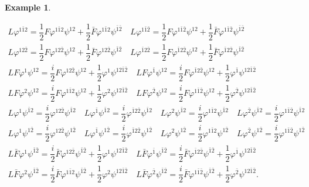 \documentclass[a4paper, 11pt]{amsart}
\theoremstyle{plain}
\theoremstyle{definition}
\newtheorem{esempio}{Example}[section]
\numberwithin{equation}{section}
\begin{document}
\begin{esempio}
\begin{itemize}
\begin{gather*}
            L\varphi^{1\bar1 2} =\dfrac{1}{2}F\varphi^{1\bar1 2}\psi^{12} + \dfrac{1}{2}\bar F\varphi^{1\bar1 2}\psi^{\bar1\bar2} \quad 
            L\varphi^{1\bar1\bar2} = \dfrac{1}{2}F\varphi^{1\bar1 \bar2}\psi^{12} + \dfrac{1}{2}\bar F\varphi^{1\bar1 \bar2}\psi^{\bar1\bar2} \\
            L\varphi^{12\bar2} = \dfrac{1}{2}F\varphi^{12\bar2}\psi^{12} + \dfrac{1}{2}\bar F\varphi^{12\bar2}\psi^{\bar1\bar2} \quad
            L\varphi^{\bar1 2\bar2}  = \dfrac{1}{2}F\varphi^{\bar1 2\bar2}\psi^{12} + \dfrac{1}{2}\bar F\varphi^{\bar1 2\bar2}\psi^{\bar1\bar2}\\ 
            LF\varphi^{1}\psi^{12} = \dfrac{i}{2}F\varphi^{12\bar2}\psi^{12} + \dfrac{1}{2}\varphi^{1}\psi^{12\bar1\bar2} \quad LF\varphi^{\bar1}\psi^{12} = \dfrac{i}{2}F\varphi^{\bar1 2\bar2}\psi^{12} + \dfrac{1}{2}\varphi^{\bar1}\psi^{12\bar1\bar2}\\
            LF\varphi^{2}\psi^{12} = \dfrac{i}{2}F\varphi^{1\bar1 2}\psi^{12} + \dfrac{1}{2}\varphi^{2}\psi^{12\bar1\bar2} \quad LF\varphi^{\bar2}\psi^{12} = \dfrac{i}{2}F\varphi^{1\bar1 \bar2}\psi^{12} + \dfrac{1}{2}\varphi^{\bar2}\psi^{12\bar1\bar2} \\
            L\varphi^{1}\psi^{\bar1 2} = \dfrac{i}{2}\varphi^{12\bar2}\psi^{\bar1 2} \quad
            L\varphi^{\bar1}\psi^{\bar1 2} = \dfrac{i}{2}\varphi^{\bar1 2\bar2}\psi^{\bar1 2} \quad
            L\varphi^{2}\psi^{\bar1 2} = \dfrac{i}{2}\varphi^{1\bar1 2}\psi^{\bar1 2} \quad 
            L\varphi^{\bar2}\psi^{\bar1 2} = \dfrac{i}{2}\varphi^{1\bar1\bar2}\psi^{\bar1 2}\\
            L\varphi^{1}\psi^{1 \bar2} = \dfrac{i}{2}\varphi^{12\bar2}\psi^{1 \bar2} \quad L\varphi^{\bar1}\psi^{1 \bar2} = \dfrac{i}{2}\varphi^{\bar1 2\bar2}\psi^{1 \bar2} \quad
            L\varphi^{2}\psi^{1 \bar2} = \dfrac{i}{2}\varphi^{1\bar1 2}\psi^{1 \bar2} \quad
            L\varphi^{\bar2}\psi^{1 \bar2} = \dfrac{i}{2}\varphi^{1\bar1 \bar2}\psi^{1 \bar2} \\
            L\bar F\varphi^{1}\psi^{\bar1\bar2} = \dfrac{i}{2}\bar F\varphi^{12\bar2}\psi^{\bar1\bar2} + \dfrac{1}{2} \varphi^{1}\psi^{12\bar1\bar2} \quad 
            L\bar F\varphi^{\bar1}\psi^{\bar1\bar2} = \dfrac{i}{2}\bar F\varphi^{\bar1 2\bar2}\psi^{\bar1\bar2} + \dfrac{1}{2} \varphi^{\bar1}\psi^{12\bar1\bar2} \\
            L\bar F\varphi^{2}\psi^{\bar1\bar2} = \dfrac{i}{2}\bar F\varphi^{1\bar1 2}\psi^{\bar1\bar2} + \dfrac{1}{2} \varphi^{2}\psi^{12\bar1\bar2} \quad 
            L\bar F\varphi^{\bar2}\psi^{\bar1\bar2} = \dfrac{i}{2}\bar F\varphi^{1\bar1\bar2}\psi^{\bar1\bar2} + \dfrac{1}{2} \varphi^{\bar2}\psi^{12\bar1\bar2}. \\

\end{gather*}
\end{itemize}
\end{esempio}
\end{document}

